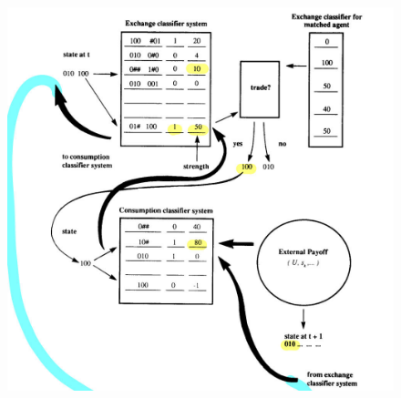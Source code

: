 \begin{frame}[plain]
    \begin{figure}
        \centering
        \includegraphics[height=\textheight]{img/Fig1_flow.jpg}
    \end{figure}
\end{frame}